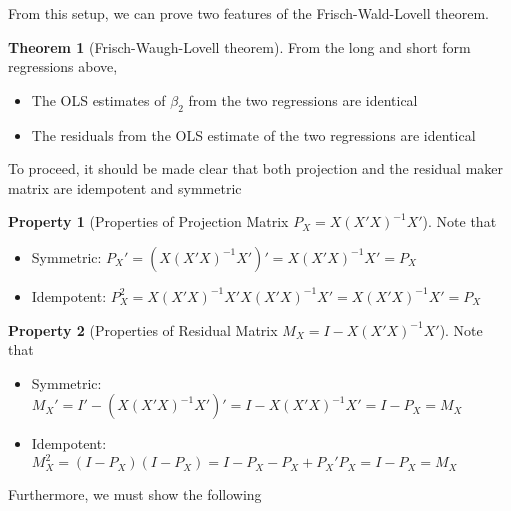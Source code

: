 \documentclass[12pt]{article}
\theoremstyle{definition}
\theoremstyle{property}
\newtheorem{property}{Property}[section]
\theoremstyle{assumption}
\theoremstyle{example}
\theoremstyle{comment}
\newtheorem{theorem}{Theorem}[section]
\begin{document}
From this setup, we can prove two features of the Frisch-Wald-Lovell theorem. 
\begin{mdframed}[backgroundcolor=green!5] 
\begin{theorem}[Frisch-Waugh-Lovell theorem] 
From the long and short form regressions above, 
\begin{itemize} 
\item The OLS estimates of $\beta_2$ from the two regressions are identical
\item The residuals from the OLS estimate of the two regressions are identical
\end{itemize}
\end{theorem}
\end{mdframed}
\par
To proceed, it should be made clear that both projection and the residual maker matrix are idempotent and symmetric
\begin{mdframed}[backgroundcolor=green!5] 
\begin{property}[Properties of Projection Matrix $P_X=X(X'X)^{-1}X'$] 
Note that
\begin{itemize} 
\item Symmetric: $P_X'=(X(X'X)^{-1}X')'=X(X'X)^{-1}X'=P_X$
\item Idempotent: $P_X^2=X(X'X)^{-1}X'X(X'X)^{-1}X'=X(X'X)^{-1}X'=P_X$
\end{itemize}
\end{property}
\end{mdframed}

\begin{mdframed}[backgroundcolor=green!5] 
\begin{property}[Properties of Residual Matrix $M_X=I-X(X'X)^{-1}X'$] 
Note that
\begin{itemize} 
\item Symmetric: $M_X'=I'-(X(X'X)^{-1}X')'=I-X(X'X)^{-1}X'=I-P_X=M_X$
\item Idempotent: $M_X^2=(I-P_X)(I-P_X)=I-P_X-P_X+P_X'P_X=I-P_X=M_X$
\end{itemize}
\end{property}
\end{mdframed}
Furthermore, we must show the following
\end{document}
